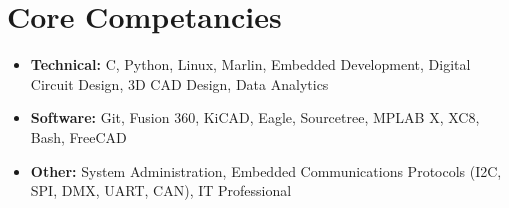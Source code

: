 \documentclass[
	10pt, %
]{FreemanCV}
\begin{document}
\begin{paracol}{2}



	
	
	
	
	
	


\end{paracol} %

\section{Core Competancies}
\begin{itemize}
	\itemsep 0pt
	\item \textbf{Technical:} C, Python, Linux, Marlin, Embedded Development, Digital Circuit Design, 3D CAD Design, Data Analytics
	\item \textbf{Software:} Git, Fusion 360, KiCAD, Eagle, Sourcetree, MPLAB X, XC8, Bash, FreeCAD
	\item \textbf{Other:} System Administration, Embedded Communications Protocols (I2C, SPI, DMX, UART, CAN), IT Professional
\end{itemize}
\end{document}
